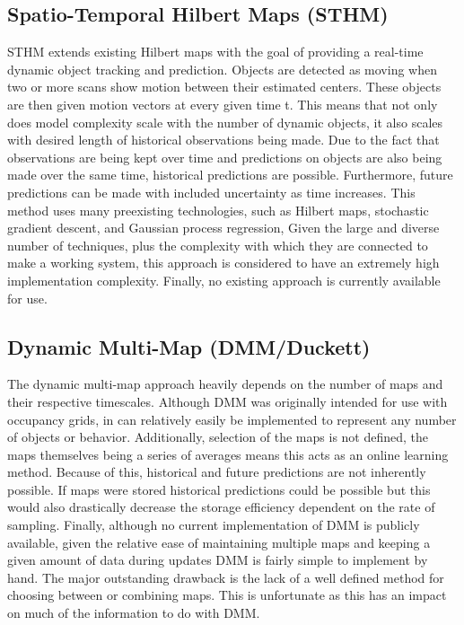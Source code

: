   \subsection{ Spatio-Temporal Hilbert Maps (STHM) }

  STHM extends existing Hilbert maps with the goal of providing a real-time
  dynamic object tracking and prediction. Objects are detected as moving when
  two or more scans show motion between their estimated centers. These objects
  are then given motion vectors at every given time t. This means that not
  only does model complexity scale with the number of dynamic objects, it also
  scales with desired length of historical observations being made. Due to the
  fact that observations are being kept over time and predictions on objects
  are also being made over the same time, historical predictions are possible.
  Furthermore, future predictions can be made with included uncertainty as
  time increases. This method uses many preexisting technologies, such
  as Hilbert maps, stochastic gradient descent, and Gaussian process regression,
  Given the large and diverse number of techniques, plus the complexity with
  which they are connected to make a working system, this approach is considered
  to have an extremely high implementation complexity. Finally, no existing
  approach is currently available for use.

  \subsection { Dynamic Multi-Map (DMM/Duckett) }
  The dynamic multi-map approach heavily depends on the number of maps and their
  respective timescales. Although DMM was originally intended for use with
  occupancy grids, in can relatively easily be implemented to represent any
  number of objects or behavior. Additionally, selection of the maps is not
  defined, the maps themselves being a series of averages means this acts as
  an online learning method. Because of this, historical and future predictions
  are not inherently possible. If maps were stored historical predictions
  could be possible but this would also drastically decrease the storage
  efficiency dependent on the rate of sampling. Finally, although no current
  implementation of DMM is publicly available, given the relative ease of
  maintaining multiple maps and keeping a given amount of data during updates
  DMM is fairly simple to implement by hand. The major outstanding drawback
  is the lack of a well defined method for choosing between or combining maps.
  This is unfortunate as this has an impact on much of the information to do
  with DMM.

